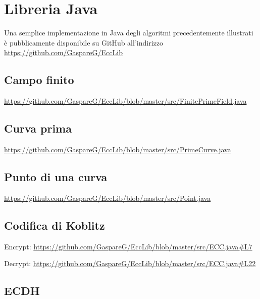 \documentclass{article}
\begin{document}
	
	\section{Libreria Java}
	
	Una semplice implementazione in Java degli algoritmi precedentemente illustrati è pubblicamente disponibile su GitHub all'indirizzo \url{https://github.com/GaspareG/EccLib}

	\subsection{Campo finito}
	
	\url{https://github.com/GaspareG/EccLib/blob/master/src/FinitePrimeField.java}
	
	\subsection{Curva prima}
	
	\url{https://github.com/GaspareG/EccLib/blob/master/src/PrimeCurve.java}
	
	\subsection{Punto di una curva}
	
	\url{https://github.com/GaspareG/EccLib/blob/master/src/Point.java}
	
	\subsection{Codifica di Koblitz}
	
	Encrypt: \url{https://github.com/GaspareG/EccLib/blob/master/src/ECC.java#L7}

	\medskip

	Decrypt: \url{https://github.com/GaspareG/EccLib/blob/master/src/ECC.java#L22}
	
	\subsection{ECDH}
	
\end{document}
